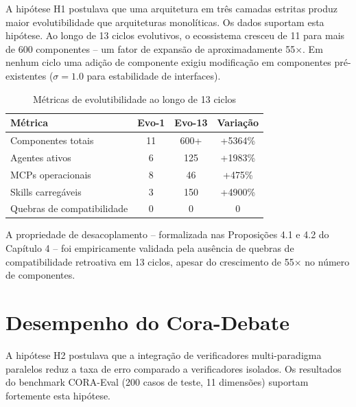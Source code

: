 \documentclass[12pt,a4paper,sumario=tradicional,openany]{abntex2}
\begin{document}
A hipótese H1 postulava que uma arquitetura em três camadas estritas produz maior evolutibilidade que arquiteturas monolíticas. Os dados suportam esta hipótese. Ao longo de 13 ciclos evolutivos, o ecossistema cresceu de 11 para mais de 600 componentes -- um fator de expansão de aproximadamente 55$\times$. Em nenhum ciclo uma adição de componente exigiu modificação em componentes pré-existentes ($\sigma = 1.0$ para estabilidade de interfaces).

\begin{table}[H]
\centering
\caption{Métricas de evolutibilidade ao longo de 13 ciclos}
\label{tab:evolvability}
\begin{tabular}{@{}lccc@{}}
\toprule
\textbf{Métrica} & \textbf{Evo-1} & \textbf{Evo-13} & \textbf{Variação} \\
\midrule
Componentes totais & 11 & 600+ & +5364\% \\
Agentes ativos & 6 & 125 & +1983\% \\
MCPs operacionais & 8 & 46 & +475\% \\
Skills carregáveis & 3 & 150 & +4900\% \\
Quebras de compatibilidade & 0 & 0 & 0 \\
\bottomrule
\end{tabular}
\end{table}

A propriedade de desacoplamento -- formalizada nas Proposições 4.1 e 4.2 do Capítulo 4 -- foi empiricamente validada pela ausência de quebras de compatibilidade retroativa em 13 ciclos, apesar do crescimento de 55$\times$ no número de componentes.

\section{Desempenho do Cora-Debate}

A hipótese H2 postulava que a integração de verificadores multi-paradigma paralelos reduz a taxa de erro comparado a verificadores isolados. Os resultados do benchmark CORA-Eval (200 casos de teste, 11 dimensões) suportam fortemente esta hipótese.
\end{document}
